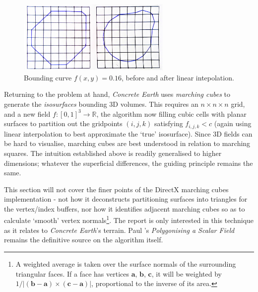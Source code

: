 \documentclass[a4paper, 11pt]{article}
\begin{document}
\begin{flushleft}
\begin{figure}[h]
\centering
\includegraphics[width=0.66\textwidth]{Interpolated Marching Squares}
\caption{Bounding curve $f(x,y) = 0.16$, before and after linear intepolation.}
\label{Interpolated Marching Squares}
\end{figure}

Returning to the problem at hand, \textit{Concrete Earth} uses \textit{marching cubes} to generate the \textit{isosurfaces} bounding 3D volumes. This requires an $n \times n \times n$ grid, and a new field $f: \left[0,1\right]^3 \rightarrow \mathbb{R}$, the algorithm now filling cubic cells with planar surfaces to partition out the gridpoints $(i,j,k)$ satisfying $f_{i,j,k} < c$ (again using linear interpolation to best approximate  the `true' isosurface). Since 3D fields can be hard to visualise, marching cubes are best understood in relation to marching squares. The intuition established above is readily generalised to higher dimensions; whatever the superficial differences, the guiding principle remains the same.

\vspace{5pt}\noindent
This section will not cover the finer points of the DirectX marching cubes implementation - not how it deconstructs partitioning surfaces into triangles for the vertex/index buffers, nor how it identifies adjacent marching cubes so as to calculate `smooth' vertex normals\footnote{A weighted average is taken over the surface normals of the surrounding triangular faces. If a face has vertices $\mathbf{a}$, $\mathbf{b}$, $\mathbf{c}$, it will be weighted by $1/|(\mathbf{b}-\mathbf{a})\times(\mathbf{c}-\mathbf{a})|$, proportional to the inverse of its area.}. The report is only interested in this technique as it relates to \textit{Concrete Earth}'s terrain. Paul \citeauthor{bourkeMarchingCubes}'s \textit{Polygonising a Scalar Field} \citeyearpar{bourkeMarchingCubes} remains the definitive source on the algorithm itself. %


\end{flushleft}
\end{document}
